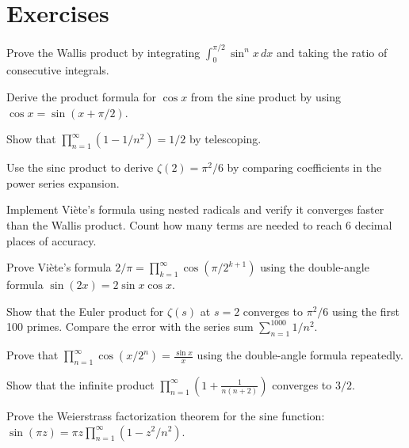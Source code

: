 \section{Exercises}

\begin{exercise}
Prove the Wallis product by integrating $\int_0^{\pi/2} \sin^n x \, dx$ and taking the ratio of consecutive integrals.
\end{exercise}

\begin{exercise}
Derive the product formula for $\cos x$ from the sine product by using $\cos x = \sin(x + \pi/2)$.
\end{exercise}

\begin{exercise}
Show that $\prod_{n=1}^{\infty} (1 - 1/n^2) = 1/2$ by telescoping.
\end{exercise}

\begin{exercise}[Proof]
Use the sinc product to derive $\zeta(2) = \pi^2/6$ by comparing coefficients in the power series expansion.
\end{exercise}

\begin{exercise}[Computational]
Implement Vi\`{e}te's formula using nested radicals and verify it converges faster than the Wallis product. Count how many terms are needed to reach 6 decimal places of accuracy.
\end{exercise}

\begin{exercise}
Prove Vi\`{e}te's formula $2/\pi = \prod_{k=1}^{\infty} \cos(\pi/2^{k+1})$ using the double-angle formula $\sin(2x) = 2\sin x \cos x$.
\end{exercise}

\begin{exercise}
Show that the Euler product for $\zeta(s)$ at $s=2$ converges to $\pi^2/6$ using the first 100 primes. Compare the error with the series sum $\sum_{n=1}^{1000} 1/n^2$.
\end{exercise}

\begin{exercise}
Prove that $\prod_{n=1}^{\infty} \cos(x/2^n) = \frac{\sin x}{x}$ using the double-angle formula repeatedly.
\end{exercise}

\begin{exercise}
Show that the infinite product $\prod_{n=1}^{\infty} \left(1 + \frac{1}{n(n+2)}\right)$ converges to $3/2$.
\end{exercise}

\begin{exercise}[Proof]
Prove the Weierstrass factorization theorem for the sine function: $\sin(\pi z) = \pi z \prod_{n=1}^{\infty} (1 - z^2/n^2)$.
\end{exercise}
